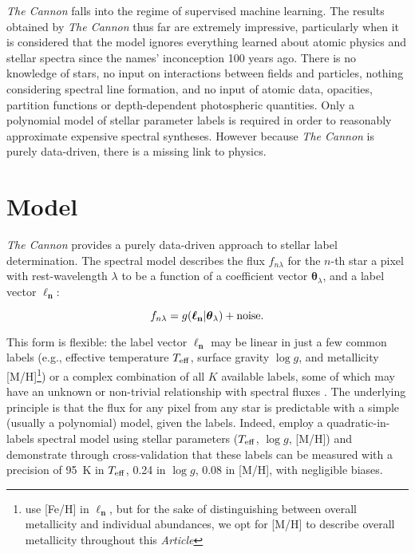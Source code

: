 \documentclass[useAMS,usenatbib]{mn2e}
\newcommand\article{\textit{Article}}
\newcommand\tc{\textit{The Cannon} }
\newcommand\lv{\mathbf{\boldsymbol\ell_n}}
\newcommand\cv{{\boldsymbol\theta}_\lambda}
\newcommand\given{|}
\begin{document}

\tc{} falls into the regime of supervised machine learning. The results obtained by \tc{} thus far are extremely impressive, particularly when it is considered that the model ignores everything learned about atomic physics and stellar spectra since the names' inconception 100 years ago. There is no knowledge of stars, no input on interactions between fields and particles, nothing considering spectral line formation, and no input of atomic data, opacities, partition functions or depth-dependent photospheric quantities. Only a polynomial model of stellar parameter labels is required in order to reasonably approximate expensive spectral syntheses. However because \tc is purely data-driven, there is a missing link to physics.




\section{Model}

\tc{} provides a purely data-driven approach to stellar label determination. The
spectral model describes the flux $f_{n\lambda}$ for the $n$-th star a pixel with rest-wavelength $\lambda$ to be a function
of a coefficient vector $\cv$, and a label vector $\lv$:

\begin{equation}
    f_{n\lambda} = g(\lv\given\cv) + {\rm noise}.
\end{equation}

This form is flexible: the label vector $\lv$ may be linear in just a few common
labels (e.g., effective temperature $T_{\rm eff}$, surface gravity $\log{g}$, and
metallicity [M/H]\footnote{\citet{Ness2015} use [Fe/H] in $\lv$, but for the 
sake of distinguishing between overall metallicity and individual abundances,
we opt for [M/H] to describe overall metallicity throughout this \article{}})
or a complex combination of all $K$ available labels, some of which may have an
 unknown or non-trivial relationship with spectral fluxes \citep[e.g., mass, 
 ages, see][]{ness_2015b}. The underlying principle
is that the flux for any pixel from any star is predictable with a simple (usually
 a polynomial) model, given the labels. Indeed, \citet{Ness2015}
employ a quadratic-in-labels spectral model using stellar
parameters ($T_{\rm eff}$, $\log{g}$, [M/H])
and demonstrate through cross-validation that these labels can be 
measured with a precision of 95~K in $T_{\rm eff}$, 0.24 in $\log{g}$, 0.08 in 
[M/H], with negligible biases. 
\end{document}
